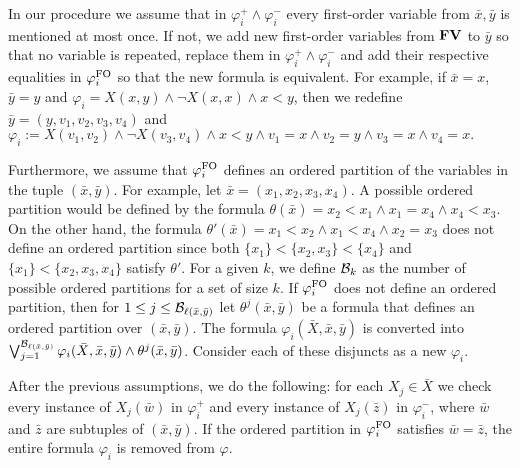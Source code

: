 In our procedure we assume that in $\varphi_i^{+}\wedge\varphi_i^{-}$ every first-order variable from $\bar{x},\bar{y}$ is mentioned at most once. If not, we add new first-order variables from $\mathbf{FV}$ to $\bar{y}$ so that no variable is repeated, replace them in $\varphi_i^{+}\wedge\varphi_i^{-}$ and add their respective equalities in $\varphi_i^{{\rm FO}}$ so that the new formula is equivalent. For example, if $\bar{x} = x$, $\bar{y} = y$ and $\varphi_i = X(x,y)\wedge \neg X(x,x) \wedge x < y$, then we redefine $\bar{y} = (y,v_1,v_2,v_3,v_4)$ and $\varphi_i := X(v_1,v_2) \wedge \neg X(v_3,v_4) \wedge x < y \wedge v_1 = x \wedge v_2 = y \wedge v_3 = x \wedge v_4 = x.$ 

Furthermore, we assume that $\varphi_i^{{\rm FO}}$ defines an ordered partition of the variables in the tuple $(\bar{x},\bar{y})$. For example, let $\bar{x} = (x_1,x_2,x_3,x_4)$. A possible ordered partition would be defined by the formula $\theta(\bar{x}) = x_2 < x_1 \wedge x_1 = x_4 \wedge x_4 < x_3$. On the other hand, the formula $\theta'(\bar{x}) = x_1 < x_2 \wedge x_1 < x_4 \wedge x_2 = x_3$ does not define an ordered partition since both $\{x_1\}<\{x_2,x_3\}<\{x_4\}$ and $\{x_1\} < \{x_2,x_3,x_4\}$ satisfy $\theta'$.
For a given $k$, we define $\mathcal{B}_k$ as the number of possible ordered partitions for a set of size $k$. 
If $\varphi_i^{{\rm FO}}$ does not define an ordered partition, then for $1 \leq j \leq \mathcal{B}_{\ell(\bar{x},\bar{y})}$ 
let $\theta^j(\bar{x},\bar{y})$ be a formula that defines an ordered partition over $(\bar{x},\bar{y})$. The formula $\varphi_i(\bar{X},\bar{x},\bar{y})$ is converted into $\bigvee_{j = 1}^{\mathcal{B}_{\ell(\bar{x},\bar{y})}}\varphi_i(\bar{X},\bar{x},\bar{y}) \wedge \theta^j(\bar{x},\bar{y})$. Consider each of these disjuncts as a new $\varphi_i$.

After the previous assumptions, we do the following: for each $X_j\in \bar{X}$ we check every instance of $X_j(\bar{w})$ in $\varphi^{+}_i$ and every instance of $X_j(\bar{z})$ in $\varphi^{-}_i$, where $\bar{w}$ and $\bar{z}$ are subtuples of $(\bar{x},\bar{y})$. If the ordered partition in $\varphi^{{\rm FO}}_i$ satisfies $\bar{w} = \bar{z}$, the entire formula $\varphi_i$ is removed from $\varphi$.

